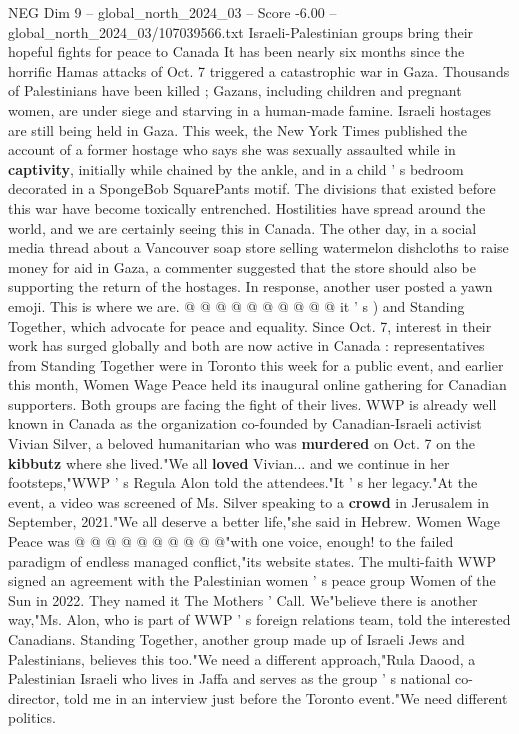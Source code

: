 \begin{textsample}{NEG Dim 9 – global\_north\_2024\_03 – Score -6.00 – global\_north\_2024\_03/107039566.txt}  \label{ex:f9_neg_246}
Israeli-Palestinian groups bring their hopeful fights for peace to Canada It has been nearly six months since the horrific Hamas attacks of Oct. 7 triggered a catastrophic war in Gaza.
Thousands of Palestinians have been killed ; Gazans, including children and pregnant women, are under siege and starving in a human-made famine.
Israeli hostages are still being held in Gaza.
This week, the New York Times published the account of a former hostage who says she was sexually assaulted while in \textbf{captivity}, initially while chained by the ankle, and in a child ' s bedroom decorated in a SpongeBob SquarePants motif.
The divisions that existed before this war have become toxically entrenched.
Hostilities have spread around the world, and we are certainly seeing this in Canada.
The other day, in a social media thread about a Vancouver soap store selling watermelon dishcloths to raise money for aid in Gaza, a commenter suggested that the store should also be supporting the return of the hostages.
In response, another user posted a yawn emoji.
This is where we are. @ @ @ @ @ @ @ @ @ @ it ' s ) and Standing Together, which advocate for peace and equality.
Since Oct. 7, interest in their work has surged globally and both are now active in Canada : representatives from Standing Together were in Toronto this week for a public event, and earlier this month, Women Wage Peace held its inaugural online gathering for Canadian supporters.
Both groups are facing the fight of their lives.
WWP is already well known in Canada as the organization co-founded by Canadian-Israeli activist Vivian Silver, a beloved humanitarian who was \textbf{murdered} on Oct. 7 on the \textbf{kibbutz} where she lived."We all \textbf{loved} Vivian... and we continue in her footsteps,"WWP ' s Regula Alon told the attendees."It ' s her legacy."At the event, a video was screened of Ms.
Silver speaking to a \textbf{crowd} in Jerusalem in September, 2021."We all deserve a better life,"she said in Hebrew.
Women Wage Peace was @ @ @ @ @ @ @ @ @ @"with one voice, enough! to the failed paradigm of endless managed conflict,"its website states.
The multi-faith WWP signed an agreement with the Palestinian women ' s peace group Women of the Sun in 2022.
They named it The Mothers ' Call.
We"believe there is another way,"Ms.
Alon, who is part of WWP ' s foreign relations team, told the interested Canadians.
Standing Together, another group made up of Israeli Jews and Palestinians, believes this too."We need a different approach,"Rula Daood, a Palestinian Israeli who lives in Jaffa and serves as the group ' s national co-director, told me in an interview just before the Toronto event."We need different politics.

\end{textsample}
